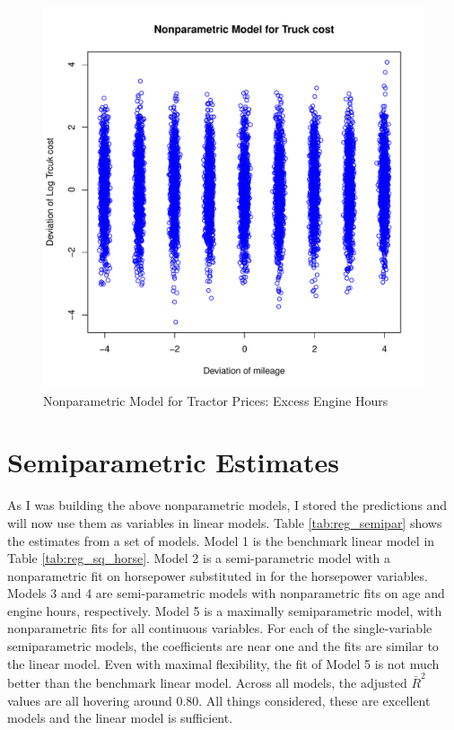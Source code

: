 \documentclass[11pt]{paper}
\begin{document}
\begin{figure}[h!]
  \centering
  \includegraphics[scale = 0.5, keepaspectratio=true]{../Figures/dev_np_vs_eng_dev}
  \caption{Nonparametric Model for Tractor Prices: Excess Engine Hours} \label{fig:dev_np_vs_eng_dev}
\end{figure}
\pagebreak
\section{Semiparametric Estimates}

As I was building the above nonparametric models, 
I stored the predictions and will now use them as variables in 
linear models. 
Table \ref{tab:reg_semipar} 
shows the estimates from a set of models. 
Model 1 is the benchmark linear model in 
Table \ref{tab:reg_sq_horse}. 
Model 2 is a semi-parametric model
with a nonparametric fit on horsepower
substituted in for the horsepower variables.
Models 3 and 4 are semi-parametric models
with nonparametric fits on age and engine hours, respectively.
Model 5 is a maximally semiparametric model, 
with nonparametric fits for all continuous variables. 
For each of the single-variable semiparametric models, 
the coefficients are near one
and the fits are similar to the linear model. 
Even with maximal flexibility, the fit of Model 5
is not much better than the benchmark linear model. 
Across all models, the adjusted $\bar{R}^2$ values are all hovering around 0.80. 
All things considered, these are excellent models
and the linear model is sufficient.
\end{document}
